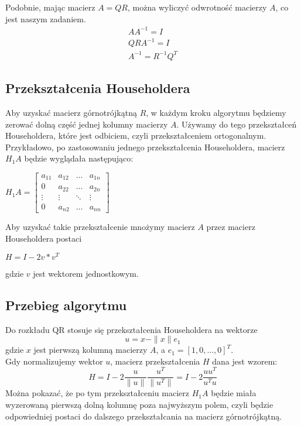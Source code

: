 \documentclass[11pt]{article}
\begin{document}
Podobnie, mając macierz $A=QR$, można wyliczyć odwrotność macierzy $A$, co jest naszym zadaniem.
\begin{align*}
AA^{-1}=I \\
QRA^{-1}=I \\
A^{-1}=R^{-1}Q^T
\end{align*}

\subsection{Przekształcenia Householdera}
Aby uzyskać macierz górnotrójkątną $R$, w każdym kroku algorytmu będziemy zerować
dolną część jednej kolumny macierzy $A$. Używamy do tego przekształceń Householdera,
które jest odbiciem, czyli przekształceniem ortogonalnym. 
Przykładowo, po zastosowaniu jednego przekształcenia Householdera,
macierz $H_1A$ będzie wyglądała następująco: 
\begin{center}
\begin{math}
H_{1}A = 
\begin{bmatrix}
    a_{11} & a_{12} & \dots  & a_{1n} \\
    0 & a_{22} & \dots  & a_{2n} \\
    \vdots & \vdots & \ddots & \vdots \\
    0 & a_{n2} & \dots  & a_{nn}
\end{bmatrix}
\end{math}
\end{center}
Aby uzyskać takie przekształcenie mnożymy macierz $A$ przez macierz Householdera postaci 
\begin{center}
$H=I-2v*v^T$
\end{center}
gdzie $v$ jest wektorem jednostkowym.\\

\subsection{Przebieg algorytmu}
Do rozkładu QR stosuje się przekształcenia Householdera na wektorze 
\begin{equation*}
u=x-\|x\|e_1
\end{equation*}
gdzie $x$ jest pierwszą kolumną macierzy $A$, a $e_1 = [1, 0, ..., 0]^T$.\\

Gdy normalizujemy wektor $u$, macierz przekształcenia $H$ dana jest wzorem:
\begin{equation*}
H=I-2\frac{u}{\|u\|}\frac{u^T}{\|u^T\|} = I-2\frac{uu^T}{u^Tu}
\end{equation*}
Można pokazać, że po tym przekształceniu macierz $H_1A$ będzie miała wyzerowaną
pierwszą dolną kolumnę poza najwyższym polem, czyli będzie odpowiedniej postaci
do dalszego przekształcania na macierz górnotrójkątną. \\
\end{document}
